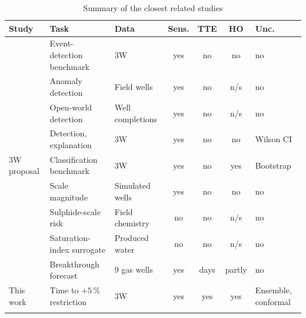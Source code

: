 \begin{table}[t]
\caption{Summary of the closest related studies}
\label{tab:related}
\footnotesize\setlength{\tabcolsep}{3pt}
\begin{tabular*}{\textwidth}{@{\extracolsep\fill}p{2.5cm}p{2.6cm}p{1.9cm}cccp{1.5cm}}
\toprule
Study & Task & Data & Sens. & TTE & HO & Unc. \\
\midrule
\citet{vargas2019,vargas2026} & Event-detection benchmark & 3W & yes & no & no & no \\
\citet{aranha2024} & Anomaly detection & Field wells & yes & no & n/s & no \\
\citet{lopes2025} & Open-world detection & Well completions & yes & no & n/s & no \\
\citet{lopes2026} & Detection, explanation & 3W & yes & no & no & Wilson CI \\
3W proposal \citep{issue231} & Classification benchmark & 3W & yes & no & yes & Bootstrap \\
\citet{cheng2022} & Scale magnitude & Simulated wells & yes & no & no & no \\
\citet{askar2025} & Sulphide-scale risk & Field chemistry & no & no & n/s & no \\
\citet{molina2025} & Saturation-index surrogate & Produced water & no & no & n/s & no \\
\citet{lai2026} & Breakthrough forecast & 9 gas wells & yes & days & partly & no \\
This work & Time to $+5\,\%$ restriction & 3W & yes & yes & yes & Ensemble, conformal \\
\botrule
\end{tabular*}
\end{table}
